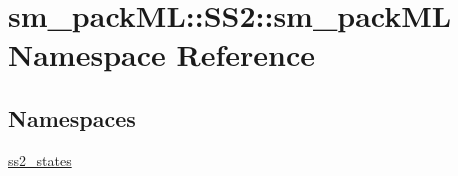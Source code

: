 \hypertarget{namespacesm__packML_1_1SS2_1_1sm__packML}{}\section{sm\+\_\+pack\+ML\+:\+:S\+S2\+:\+:sm\+\_\+pack\+ML Namespace Reference}
\label{namespacesm__packML_1_1SS2_1_1sm__packML}
\subsection*{Namespaces}
\begin{DoxyCompactItemize}
\item 
 \hyperlink{namespacesm__packML_1_1SS2_1_1sm__packML_1_1ss2__states}{ss2\+\_\+states}
\end{DoxyCompactItemize}
